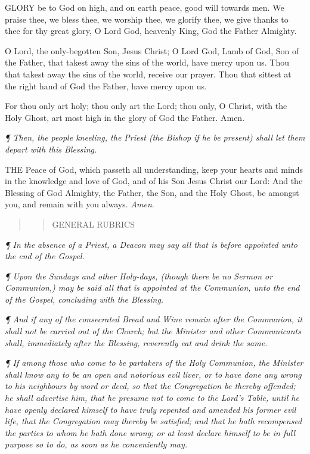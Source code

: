 GLORY
be to God on high, and on earth peace, good will towards men. We praise
thee, we bless thee, we worship thee, we glorify thee, we give thanks
to thee for thy great glory, O Lord God, heavenly King, God the Father
Almighty.

O Lord, the only-begotten Son, Jesus Christ; O Lord
God, Lamb of God, Son of the Father, that takest away the sins of the
world, have mercy upon us. Thou that takest away the sins of the world,
receive our prayer. Thou that sittest at the right hand of God the Father,
have mercy upon us.

For thou only art holy; thou only art the Lord; thou
only, O Christ, with the Holy Ghost, art most high in the glory of God
the Father. Amen.

\emph{¶
Then, the people kneeling, the Priest (the Bishop if he be present) shall
let them depart with this Blessing.}

THE
Peace of God, which passeth all understanding, keep your hearts and minds
in the knowledge and love of God, and of his Son Jesus Christ our Lord:
And the Blessing of God Almighty, the Father, the Son, and the Holy Ghost,
be amongst you, and remain with you always. \emph{Amen}.

\begin{quote}

\begin{quote}

GENERAL RUBRICS

\end{quote}

\end{quote}

\emph{¶ In the absence of a Priest, a Deacon may say all that is before
appointed unto the end of the Gospel.}

\emph{¶
Upon the Sundays and other Holy-days, (though there be no Sermon or Communion,)
may be said all that is appointed at the Communion, unto the end of the
Gospel, concluding with the Blessing.}

\emph{¶
And if any of the consecrated Bread and Wine remain after the Communion,
it shall not be carried out of the Church; but the Minister and other
Communicants shall, immediately after the Blessing, reverently eat and
drink the same.}

\emph{¶
If among those who come to be partakers of the Holy Communion, the Minister
shall know any to be an open and notorious evil liver, or to have done
any wrong to his neighbours by word or deed, so that the Congregation
be thereby offended; he shall advertise him, that he presume not to come
to the Lord’s Table, until he have openly declared himself to have
truly repented and amended his former evil life, that the Congregation
may thereby be satisfied; and that he hath recompensed the parties to
whom he hath done wrong; or at least declare himself to be in full purpose
so to do, as soon as he conveniently may.}

